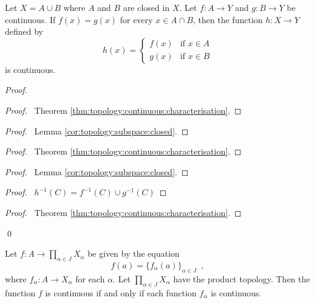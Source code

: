 \begin{thm}
  Let $X = A \cup B$ where $A$ and $B$ are closed in $X$. Let $f : A
  \rightarrow
  Y$ and $g : B \rightarrow Y$ be continuous. If $f(x) = g(x)$ for every $x
  \in A
  \cap B$, then the function $h : X \rightarrow Y$ defined by
  \[ h(x) = \begin{cases}
    f(x) & \text{if } x \in A \\
    g(x) & \text{if } x \in B
  \end{cases} \]
  is continuous.
\end{thm}

\begin{proof}
  \pf
  \begin{proof}
    \pf\ Theorem \ref{thm:topology:continuous:characterisation}.
  \end{proof}
  \begin{proof}
    \pf\ Lemma \ref{cor:topology:subspace:closed}.
  \end{proof}
  \begin{proof}
    \pf\ Theorem \ref{thm:topology:continuous:characterisation}.
  \end{proof}
  \begin{proof}
    \pf\ Lemma \ref{cor:topology:subspace:closed}.
  \end{proof}
  \begin{proof}
    \pf\ $h^{-1}(C) = f^{-1}(C) \cup g^{-1}(C)$
  \end{proof}
  \qedstep
  \begin{proof}
    \pf\ Theorem \ref{thm:topology:continuous:characterisation}.
  \end{proof}
  \qed
\end{proof}

\begin{thm}
  \label{thm:topology:continuous:product}
  Let $f : A \rightarrow \prod_{\alpha \in J} X_\alpha$ be given by the
  equation
  \[ f(a) = \{ f_\alpha(a) \}_{\alpha \in J} \enspace , \]
  where $f_\alpha : A \rightarrow X_\alpha$ for each $\alpha$. Let
  $\prod_{\alpha
    \in J} X_\alpha$ have the product topology. Then the function $f$ is
  continuous if and only if each function $f_\alpha$ is continuous.
\end{thm}

